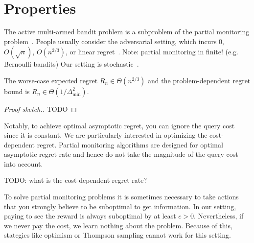 \documentclass[a4paper]{article}
\begin{document}
\section{Properties}

The active multi-armed bandit problem is
a subproblem of the partial monitoring problem~\citep{Piccolboni01}.
People usually consider the adversarial setting,
which incurs $0$, $O(\sqrt{n})$, $O(n^{2/3})$, or linear regret~\citep{Antos13}.
Note: partial monitoring in finite! (e.g. Bernoulli bandits)
Our setting is stochastic~\citep{Komiyama15}.


\begin{proposition}
The worse-case expected regret $R_n \in \Theta(n^{2/3})$
and the problem-dependent regret bound is $R_n \in \Theta(1/\Delta_{\min}^2)$.
\end{proposition}
\begin{proof}[Proof sketch.]
TODO
\end{proof}

Notably, to achieve optimal asymptotic regret, you can ignore the query cost since it is constant.
We are particularly interested in optimizing
the cost-dependent regret.
Partial monitoring algorithms are designed for optimal asymptotic regret rate and hence do not take the magnitude of the query cost into account.

TODO: what is the cost-dependent regret rate?

To solve partial monitoring problems
it is sometimes necessary to take actions that you strongly believe to be suboptimal to get information.
In our setting, paying to see the reward is always suboptimal
by at least $c > 0$.
Nevertheless, if we never pay the cost, we learn nothing about the problem.
Because of this, stategies like optimism or Thompson sampling cannot work for this setting.
\end{document}
